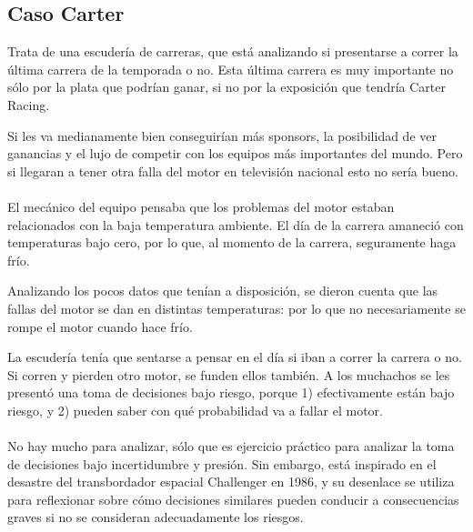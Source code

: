 \documentclass{article}
\begin{document}
        \subsection*{Caso Carter}
            Trata de una escudería de carreras, que está analizando si presentarse a correr la última carrera de la temporada o no. Esta última carrera es muy importante no sólo por la plata que podrían ganar, si no por la exposición que tendría Carter Racing.
            
            Si les va medianamente bien conseguirían más sponsors, la posibilidad de ver ganancias y el lujo de competir con los equipos más importantes del mundo. Pero si llegaran a tener otra falla del motor en televisión nacional esto no sería bueno.
            \\
            \\
            El mecánico del equipo pensaba que los problemas del motor estaban relacionados con la baja temperatura ambiente. El día de la carrera amaneció con temperaturas bajo cero, por lo que, al momento de la carrera, seguramente haga frío.

            Analizando los pocos datos que tenían a disposición, se dieron cuenta que las fallas del motor se dan en distintas temperaturas: por lo que no necesariamente se rompe el motor cuando hace frío.

            La escudería tenía que sentarse a pensar en el día si iban a correr la carrera o no. Si corren y pierden otro motor, se funden ellos también. A los muchachos se les presentó una toma de decisiones bajo riesgo, porque 1) efectivamente están bajo riesgo, y 2) pueden saber con qué probabilidad va a fallar el motor.
            \\
            \\
            No hay mucho para analizar, sólo que es ejercicio práctico para analizar la toma de decisiones bajo incertidumbre y presión. Sin embargo, está inspirado en el desastre del transbordador espacial Challenger en 1986, y su desenlace se utiliza para reflexionar sobre cómo decisiones similares pueden conducir a consecuencias graves si no se consideran adecuadamente los riesgos.
\end{document}
